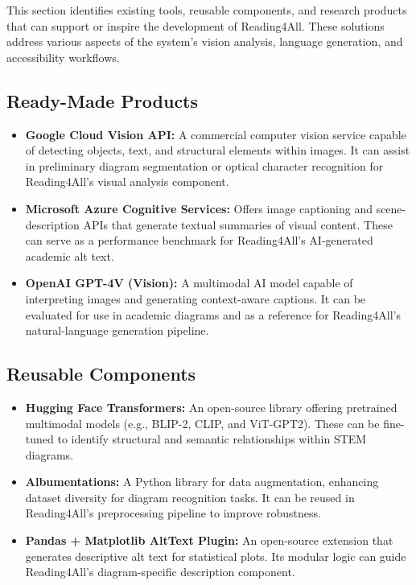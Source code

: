 \documentclass[12pt]{article}
\begin{document}
This section identifies existing tools, reusable components, and research products that can support or inspire the development of Reading4All. These solutions address various aspects of the system’s vision analysis, language generation, and accessibility workflows.

\subsection{Ready-Made Products}

\begin{itemize}
    \item \textbf{Google Cloud Vision API:} A commercial computer vision service capable of detecting objects, text, and structural elements within images. It can assist in preliminary diagram segmentation or optical character recognition for Reading4All’s visual analysis component.

    \item \textbf{Microsoft Azure Cognitive Services:} Offers image captioning and scene-description APIs that generate textual summaries of visual content. These can serve as a performance benchmark for Reading4All’s AI-generated academic alt text.

    \item \textbf{OpenAI GPT-4V (Vision):} A multimodal AI model capable of interpreting images and generating context-aware captions. It can be evaluated for use in academic diagrams and as a reference for Reading4All’s natural-language generation pipeline.
\end{itemize}

\subsection{Reusable Components}

\begin{itemize}
    \item \textbf{Hugging Face Transformers:} An open-source library offering pretrained multimodal models (e.g., BLIP-2, CLIP, and ViT-GPT2). These can be fine-tuned to identify structural and semantic relationships within STEM diagrams.

    \item \textbf{Albumentations:} A Python library for data augmentation, enhancing dataset diversity for diagram recognition tasks. It can be reused in Reading4All’s preprocessing pipeline to improve robustness.

    \item \textbf{Pandas + Matplotlib AltText Plugin:} An open-source extension that generates descriptive alt text for statistical plots. Its modular logic can guide Reading4All’s diagram-specific description component.
\end{itemize}
\end{document}

